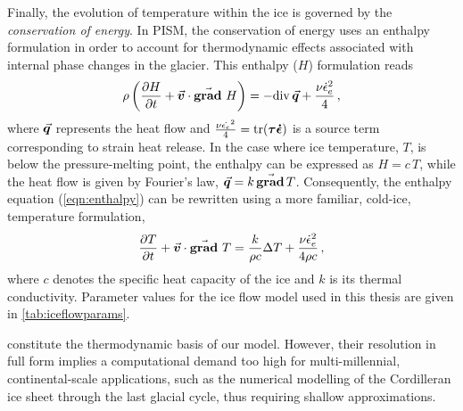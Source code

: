 \documentclass{article}
\newcommand{\vect}[1]{\va*{#1}} %
\newcommand{\tens}[1]{\vb*{#1}} %
\renewcommand{\div}[1]{\mathrm{div}\,#1}            %
\renewcommand{\grad}[1]{\vect{\mathrm{grad}}\,#1}   %
\newcommand{\matdv}[1]{\pdv{#1}{t}+\vect{v}\cdot\grad{}\,#1}  %
\newcommand{\doteps}[0]{\dot{\epsilon}} %
\newcommand{\DST}[0]{\tens{\tau}}       %
\newcommand{\SRT}[0]{\tens{\doteps}}    %
\begin{document}
Finally, the evolution of temperature within the ice is governed by the
\emph{conservation of energy}. In PISM, the conservation of energy uses an
enthalpy formulation \citep[Eqs.~20--21]{Aschwanden.etal.2012} in order to
account for thermodynamic effects associated with internal phase changes in the
glacier. This enthalpy ($H$) formulation reads
\begin{equation}
    \label{eqn:enthalpy}
    \rho \left(\matdv{H}\right)
        = -\div{\vect{q}} + \frac{\nu\doteps_e^2}{4} \,,
\end{equation}
where $\vect{q}$ represents the heat flow and
${\frac{\nu\dot{\epsilon_e}^2}{4} = \tr(\DST\SRT)}$ is a
source term corresponding to strain heat release. In the case where ice
temperature, $T$, is below the pressure-melting point, the enthalpy can be
expressed as $H=c\,T$, while the heat flow is given by Fourier's law,
$\vect{q} = k\,\grad{T}$. Consequently, the enthalpy equation
(\ref{eqn:enthalpy}) can be rewritten using a more familiar, cold-ice,
temperature formulation,
\begin{equation}
    \label{eqn:temperature}
    \matdv{T} = \frac{k}{\rho c} \Delta T
                + \frac{\nu\doteps_e^2}{4\rho c} \,,
\end{equation}
where $c$ denotes the specific heat capacity of the ice and $k$ is its thermal
conductivity. Parameter values for the ice flow model used in this thesis are
given in \cref{tab:iceflowparams}.

constitute the thermodynamic basis
of our model. However, their resolution in full form implies a computational
demand too high for multi-millennial, continental-scale applications, such as
the numerical modelling of the Cordilleran ice sheet through the last glacial
cycle, thus requiring shallow approximations.
\end{document}
